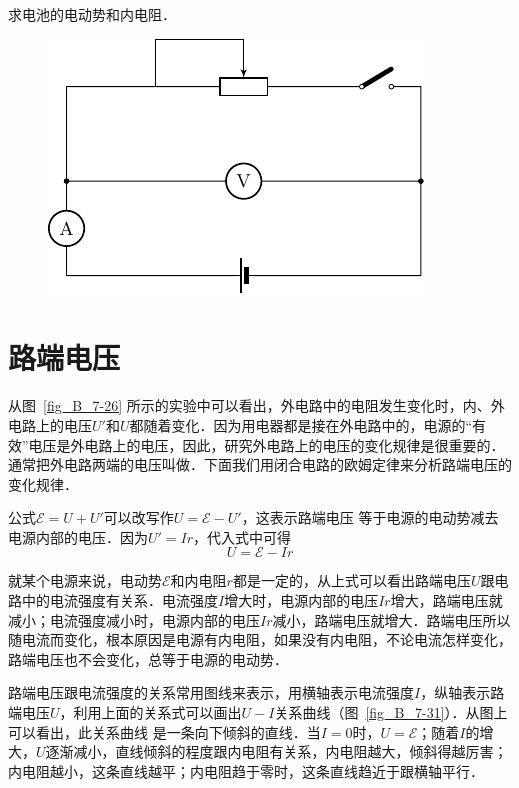 \begin{enumerate}
    求电池的电动势和内电阻．
    \begin{figure}[htbp]
        \centering
        \includegraphics{fig/B/7-30.pdf}
        \caption{}\label{fig_B_7-30}
    \end{figure}
\end{enumerate}




  

\section{路端电压}
从图~\ref{fig_B_7-26} 所示的实验中可以看出，外电路中的电阻发生变化时，内、外电路上的电压$U'$和$U$都随着变化．因为用电器都是接在外电路中的，电源的“有效”电压是外电路上的电压，因此，研究外电路上的电压的变化规律是很重要的．
通常把外电路两端的电压叫做．下面我们用闭合电路的欧姆定律来分析路端电压的变化规律．

公式$\mathcal{E}=U+U'$可以改写作$U=\mathcal{E}-U'$，这表示路端电压
等于电源的电动势减去电源内部的电压．因为$U'=Ir$，代入式中可得
\[U=\mathcal{E}-Ir\]

就某个电源来说，电动势$\mathcal{E}$和内电阻$r$都是一定的，从上式可以看出路端电压$U$跟电路中的电流强度有关系．电流强度$I$增大时，电源内部的电压$Ir$增大，路端电压就减小；电流强度减小时，电源内部的电压$Ir$减小，路端电压就增大．路端电压所以随电流而变化，根本原因是电源有内电阻，如果没有内电阻，不论电流怎样变化，路端电压也不会变化，总等于电源的电动势．


路端电压跟电流强度的关系常用图线来表示，用横轴表示电流强度$I$，纵轴表示路端电压$U$，利用上面的关系式可以画出$U-I$关系曲线（图~\ref{fig_B_7-31}）．从图上可以看出，此关系曲线
是一条向下倾斜的直线．当$I=0$时，$U=\mathcal{E}$；随着$I$的增大，$U$逐渐减小，直线倾斜的程度跟内电阻有关系，内电阻越大，倾斜得越厉害；内电阻越小，这条直线越平；内电阻趋于零时，这条直线趋近于跟横轴平行．

